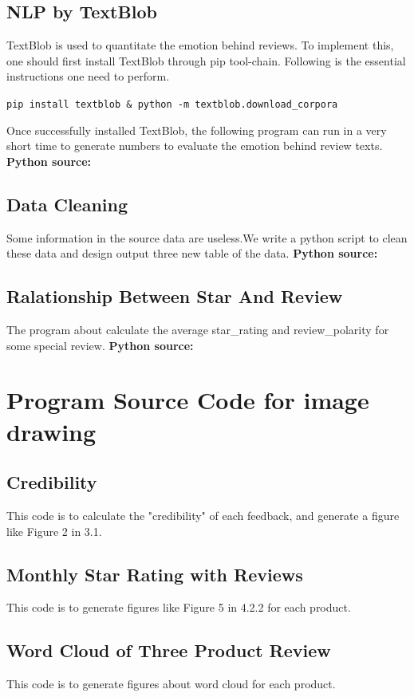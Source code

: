 \documentclass{mcmthesis}
\begin{document}
\begin{appendices}
    \subsection{NLP by TextBlob}
    TextBlob is used to quantitate the emotion behind reviews. To implement this, one should first install TextBlob through pip tool-chain. Following is the essential instructions one need to perform.\\
    \begin{center}
        \texttt{pip\ install\ textblob \& python\ -m textblob.download\_corpora}
    \end{center}
    Once successfully installed TextBlob, the following program can run in a very short time to generate numbers to evaluate the emotion behind review texts.
    \newline
    \textcolor[rgb]{0.98,0.00,0.00}{\textbf{Python source:}}
    
    \subsection{Data Cleaning}
    Some information in the source data are useless.We write a python script to
    clean these data and design output three new table of the data.
    \newline
    \textcolor[rgb]{0.98,0.00,0.00}{\textbf{Python source:}}
    
    \subsection{Ralationship Between Star And Review}
    The program about calculate the average star\_rating and review\_polarity for some special review.
    \newline
    \textcolor[rgb]{0.98,0.00,0.00}{\textbf{Python source:}}
    
\newpage
\section{Program Source Code for image drawing}
    \subsection{Credibility}
    This code is to calculate the "credibility" of each feedback, and generate a figure like Figure 2 in 3.1.
    
    \subsection{Monthly Star Rating with Reviews}
    This code is to generate figures like Figure 5 in 4.2.2 for each product.
    
    \subsection{Word Cloud of Three Product Review}
    This code is to generate figures about word cloud for each product.
    
\end{appendices}
\end{document}
